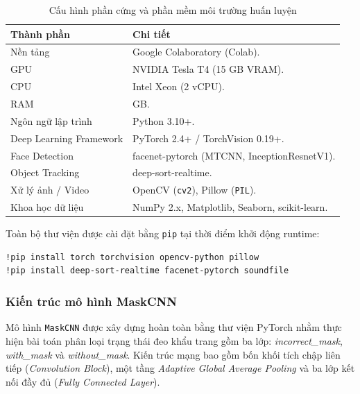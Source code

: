 \documentclass[a4paper,12pt]{article}
\begin{document}
\begin{table}[H]
\centering
\caption{Cấu hình phần cứng và phần mềm môi trường huấn luyện}
\label{tab:hardware_software_config}

\renewcommand{\arraystretch}{1.5} 
\begin{tabularx}{\textwidth}{|>{\raggedright\arraybackslash}p{5.5cm}|>{\raggedright\arraybackslash}X|}
\hline
\rowcolor{headerblue} 
\textbf{\color{white}Thành phần} & \textbf{\color{white}Chi tiết} \\ \hline
Nền tảng & Google Colaboratory (Colab). \\ \hline
GPU & NVIDIA Tesla T4 (15 GB VRAM). \\ \hline
CPU & Intel Xeon (2 vCPU). \\ \hline
RAM & 12.7 GB. \\ \hline
Ngôn ngữ lập trình & Python 3.10+. \\ \hline
Deep Learning Framework & PyTorch 2.4+ / TorchVision 0.19+. \\ \hline
Face Detection & facenet-pytorch (MTCNN, InceptionResnetV1). \\ \hline
Object Tracking & deep-sort-realtime. \\ \hline
Xử lý ảnh / Video & OpenCV (\texttt{cv2}), Pillow (\texttt{PIL}). \\ \hline
Khoa học dữ liệu & NumPy 2.x, Matplotlib, Seaborn, scikit-learn. \\ \hline
\end{tabularx}
\end{table}

Toàn bộ thư viện được cài đặt bằng \texttt{pip} tại thời điểm khởi động runtime:

\begin{verbatim}
!pip install torch torchvision opencv-python pillow
!pip install deep-sort-realtime facenet-pytorch soundfile
\end{verbatim}

\subsubsection{Kiến trúc mô hình MaskCNN}

Mô hình \texttt{MaskCNN} được xây dựng hoàn toàn bằng thư viện PyTorch nhằm thực hiện bài toán phân loại trạng thái đeo khẩu trang gồm ba lớp: \textit{incorrect\_mask}, \textit{with\_mask} và \textit{without\_mask}. Kiến trúc mạng bao gồm bốn khối tích chập liên tiếp (\textit{Convolution Block}), một tầng \textit{Adaptive Global Average Pooling} và ba lớp kết nối đầy đủ (\textit{Fully Connected Layer}).
\end{document}
